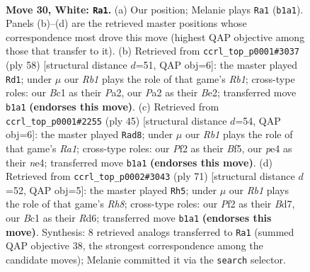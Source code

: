 \documentclass[11pt]{article}
\begin{document}
\clearpage

\begin{figure}[p]\centering
\begin{subfigure}{0.46\textwidth}\centering
\resizebox{\linewidth}{!}{%
\newchessgame
\chessboard[
  setfen={r3k1r1/5p2/5n2/8/p3p2p/3p3P/PP3P2/1RBK1R2 w q - 0 30},
  showmover=false,
  pgfstyle=straightmove, color=movearrow, markmove={b1-a1}
]}
\caption{}
\end{subfigure}\hfill
\begin{subfigure}{0.46\textwidth}\centering
\resizebox{\linewidth}{!}{%
\newchessgame
\chessboard[
  setfen={3r1k2/1p1n1p2/2p2P1p/4p3/1P2P2P/4K3/P3B3/1R6 w - - 1 30},
  showmover=false,
  pgfstyle=straightmove, color=movearrow, markmove={b1-d1}
]}
\caption{}
\end{subfigure}
\\[4pt]
\begin{subfigure}{0.46\textwidth}\centering
\resizebox{\linewidth}{!}{%
\newchessgame
\chessboard[
  setfen={r6r/ppp5/2p4k/5b1p/4N2P/6R1/PPP2P2/4R1K1 b - - 0 23},
  showmover=false,
  pgfstyle=straightmove, color=movearrow, markmove={a8-d8}
]}
\caption{}
\end{subfigure}\hfill
\begin{subfigure}{0.46\textwidth}\centering
\resizebox{\linewidth}{!}{%
\newchessgame
\chessboard[
  setfen={8/1k1b4/3r1p2/2p2P2/p1P5/N3R3/PPK2R2/7r b - - 7 36},
  showmover=false,
  pgfstyle=straightmove, color=movearrow, markmove={h1-h5}
]}
\caption{}
\end{subfigure}
\caption{\textbf{Move 30, White: \texttt{Ra1}.} (a) Our position; Melanie plays \texttt{Ra1} (\texttt{b1a1}). Panels (b)--(d) are the retrieved master positions whose correspondence most drove this move (highest QAP objective among those that transfer to it). (b) Retrieved from \texttt{ccrl\_top\_p0001\#3037} (ply 58) [structural distance $d$=51, QAP obj=6]: the master played \texttt{Rd1}; under $\mu$ our \emph{Rb1} plays the role of that game's \emph{Rb1}; cross-type roles: our \emph{B}c1 as their \emph{P}a2, our \emph{P}a2 as their \emph{B}e2; transferred move \texttt{b1a1} \textbf{(endorses this move)}. (c) Retrieved from \texttt{ccrl\_top\_p0001\#2255} (ply 45) [structural distance $d$=54, QAP obj=6]: the master played \texttt{Rad8}; under $\mu$ our \emph{Rb1} plays the role of that game's \emph{Ra1}; cross-type roles: our \emph{P}f2 as their \emph{B}f5, our \emph{p}e4 as their \emph{n}e4; transferred move \texttt{b1a1} \textbf{(endorses this move)}. (d) Retrieved from \texttt{ccrl\_top\_p0002\#3043} (ply 71) [structural distance $d$=52, QAP obj=5]: the master played \texttt{Rh5}; under $\mu$ our \emph{Rb1} plays the role of that game's \emph{Rh8}; cross-type roles: our \emph{P}f2 as their \emph{B}d7, our \emph{B}c1 as their \emph{R}d6; transferred move \texttt{b1a1} \textbf{(endorses this move)}. Synthesis: 8 retrieved analogs transferred to \texttt{Ra1} (summed QAP objective 38, the strongest correspondence among the candidate moves); Melanie committed it via the \texttt{search} selector.}
\label{fig:thought-m58}
\end{figure}
\end{document}
